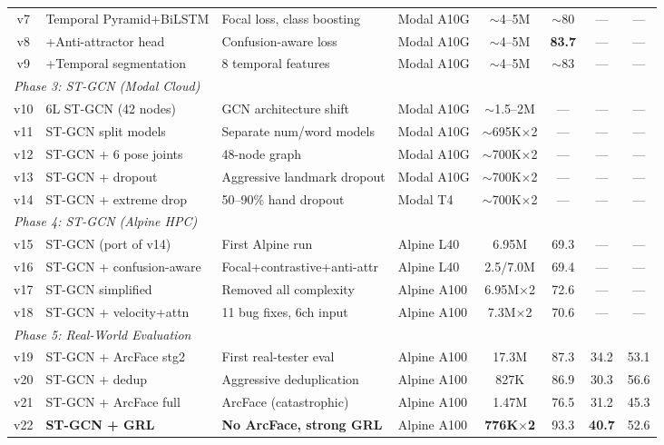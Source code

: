 \documentclass[conference]{IEEEtran}
\begin{document}
\begin{table}[t]
\begin{tabular}{@{}clllcccc@{}}
v7  & Temporal Pyramid+BiLSTM & Focal loss, class boosting & Modal A10G & $\sim$4--5M & $\sim$80 & --- & --- \\
v8  & +Anti-attractor head   & Confusion-aware loss       & Modal A10G & $\sim$4--5M & \textbf{83.7} & --- & --- \\
v9  & +Temporal segmentation & 8 temporal features        & Modal A10G & $\sim$4--5M & $\sim$83 & --- & --- \\
\midrule
\multicolumn{8}{l}{\textit{Phase 3: ST-GCN (Modal Cloud)}} \\
v10 & 6L ST-GCN (42 nodes)   & GCN architecture shift     & Modal A10G & $\sim$1.5--2M & --- & --- & --- \\
v11 & ST-GCN split models    & Separate num/word models   & Modal A10G & $\sim$695K$\times$2 & --- & --- & --- \\
v12 & ST-GCN + 6 pose joints & 48-node graph              & Modal A10G & $\sim$700K$\times$2 & --- & --- & --- \\
v13 & ST-GCN + dropout       & Aggressive landmark dropout & Modal A10G & $\sim$700K$\times$2 & --- & --- & --- \\
v14 & ST-GCN + extreme drop  & 50--90\% hand dropout      & Modal T4   & $\sim$700K$\times$2 & --- & --- & --- \\
\midrule
\multicolumn{8}{l}{\textit{Phase 4: ST-GCN (Alpine HPC)}} \\
v15 & ST-GCN (port of v14)   & First Alpine run           & Alpine L40 & 6.95M & 69.3 & --- & --- \\
v16 & ST-GCN + confusion-aware & Focal+contrastive+anti-attr & Alpine L40 & 2.5/7.0M & 69.4 & --- & --- \\
v17 & ST-GCN simplified      & Removed all complexity     & Alpine A100 & 6.95M$\times$2 & 72.6 & --- & --- \\
v18 & ST-GCN + velocity+attn & 11 bug fixes, 6ch input    & Alpine A100 & 7.3M$\times$2 & 70.6 & --- & --- \\
\midrule
\multicolumn{8}{l}{\textit{Phase 5: Real-World Evaluation}} \\
v19 & ST-GCN + ArcFace stg2 & First real-tester eval      & Alpine A100 & 17.3M & 87.3 & 34.2 & 53.1 \\
v20 & ST-GCN + dedup         & Aggressive deduplication    & Alpine A100 & 827K  & 86.9 & 30.3 & 56.6 \\
v21 & ST-GCN + ArcFace full  & ArcFace (catastrophic)     & Alpine A100 & 1.47M & 76.5 & 31.2 & 45.3 \\
v22 & \textbf{ST-GCN + GRL}  & \textbf{No ArcFace, strong GRL} & Alpine A100 & \textbf{776K$\times$2} & 93.3 & \textbf{40.7} & 52.6 \\

\end{tabular}
\end{table}
\end{document}
